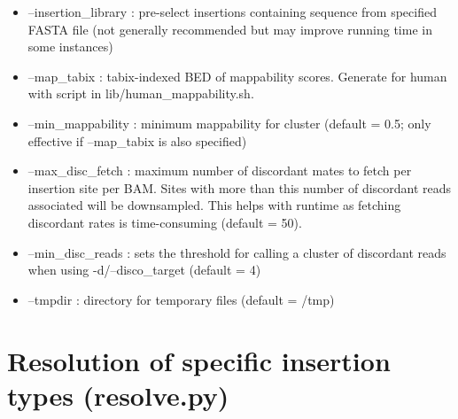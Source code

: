 \documentclass[letterpaper,11pt]{article}
\begin{document}
\begin{itemize}
\item --insertion\_library : pre-select insertions containing sequence from specified FASTA file (not generally recommended but may improve running time in some instances)
\item --map\_tabix : tabix-indexed BED of mappability scores. Generate for human with script in lib/human\_mappability.sh.
\item --min\_mappability : minimum mappability for cluster (default = 0.5; only effective if --map\_tabix is also specified)
\item --max\_disc\_fetch : maximum number of discordant mates to fetch per insertion site per BAM. Sites with more than this number of discordant reads associated will be downsampled. This helps with runtime as fetching discordant rates is time-consuming (default = 50).
\item --min\_disc\_reads : sets the threshold for calling a cluster of discordant reads when using -d/--disco\_target (default = 4)
\item --tmpdir : directory for temporary files (default = /tmp)

\end{itemize}


\section{Resolution of specific insertion types (resolve.py)}
\end{document}
